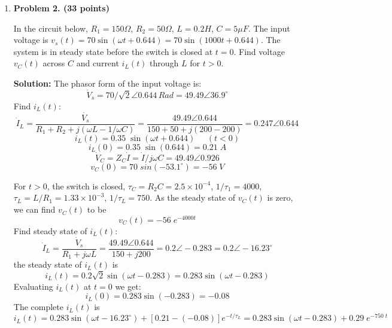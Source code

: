 \begin{enumerate}
\item {\bf Problem 2. (33 points)} 

  In the circuit below, $R_1=150\Omega$, $R_2=50\Omega$, $L=0.2H$, $C=5\mu F$.
  The input voltage is $v_s(t)=70\sin(\omega t+0.644)=70\sin(1000 t+0.644)$.
  The system is in steady state before the switch is closed at $t=0$. Find voltage 
  $v_C(t)$ across $C$ and current $i_L(t)$ through $L$ for $t>0$.



  {\bf Solution:} 
  The phasor form of the input voltage is:
  \[
  \dot{V}_s=70/\sqrt{2}\angle 0.644\,Rad =49.49\angle 36.9^\circ 
  \]
  Find $i_L(t)$:
  \[
  \dot{I}_L=\frac{\dot{V_s}}{R_1+R_2+j(\omega L-1/\omega C)}
  =\frac{49.49\angle 0.644}{150+50+j(200-200)}=0.247\angle 0.644
  \]
  \[
  i_L(t)=0.35\;\sin(\omega t+0.644)\;\;\;\;\;(t<0) 
  \]
  \[
  i_L(0)=0.35\;\sin(0.644)=0.21\;A 
  \]
  \[
  \dot{V}_C=Z_C \dot{I}=\dot{I}/j\omega C =49.49\angle 0.926
  \]
  \[
  v_C(0)=70\;sin(-53.1^\circ)=-56\;V 
  \]

  For $t>0$, the switch is closed, $\tau_C=R_2C=2.5\times 10^{-4}$, 
  $1/\tau_1=4000$, $\tau_L=L/R_1=1.33\times 10^{-3}$, $1/\tau_L=750$.
  As the steady state of $v_C(t)$ is zero, we can find $v_C(t)$ to be
  \[
  v_C(t)=-56\;e^{-4000  t} 
  \]
  Find steady state of $i_L(t)$:
  \[
  \dot{I}_L=\frac{\dot{V}_s}{R_1+j\omega L}=\frac{49.49\angle 0.644}{150+j200}
  =0.2\angle -0.283 = 0.2\angle -16.23^\circ
  \]
  the steady state of $i_L(t)$ is
  \[ 
  i_L(t)=0.2\sqrt{2}\sin(\omega t-0.283)=0.283\sin(\omega t-0.283)
  \]
  Evaluating $i_L(t)$ at $t=0$ we get:
  \[ 
  i_L(0)=0.283\sin(-0.283)=-0.08 
  \]
  The complete $i_L(t)$ is
  \[
  i_L(t)=0.283\sin(\omega t-16.23^\circ)+[0.21-(-0.08)]e^{-t/\tau_L}
  =0.283\sin(\omega t-0.283)+0.29\;e^{-750\;t} 
  \]



%



\end{enumerate}
